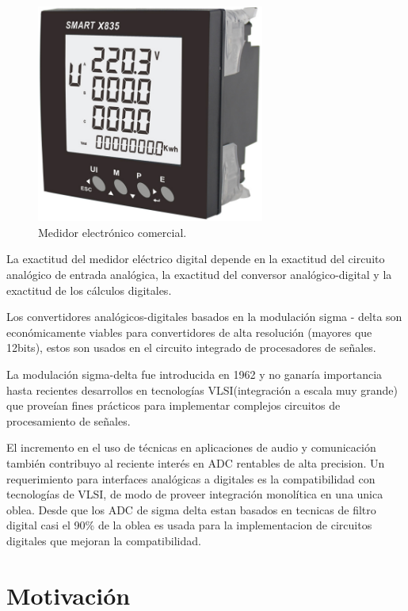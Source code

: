 \begin{figure}[h]
	\centering
	\includegraphics[width=75mm,keepaspectratio]{Figures/3931_1.png}
	\caption{Medidor electrónico comercial.}
	\label{fig:texmaker}
\end{figure}

La exactitud del medidor eléctrico digital depende en la exactitud del circuito analógico de entrada analógica, la exactitud del conversor analógico-digital y la exactitud de los cálculos digitales.\citep{Hribik2004DigitalPA}

Los convertidores analógicos-digitales basados en la modulación sigma - delta son económicamente viables para convertidores de alta resolución (mayores que 12bits), estos son  usados en el circuito integrado de procesadores de señales.

La modulación sigma-delta fue introducida en 1962 y no ganaría importancia hasta recientes desarrollos en tecnologías VLSI(integración a escala muy grande) que proveían fines prácticos para implementar complejos circuitos de procesamiento de señales.

 El incremento en el uso de técnicas en aplicaciones de audio y comunicación también contribuyo al reciente interés en ADC rentables de alta precision. Un requerimiento para interfaces analógicas a digitales es la compatibilidad con tecnologías de VLSI, de modo de proveer integración monolítica en  una unica oblea. Desde que los ADC de sigma delta estan basados en tecnicas de filtro digital casi el 90\% de la oblea es usada para la implementacion de circuitos digitales que mejoran la compatibilidad.\citep{book:28601}











\section{Motivación}

